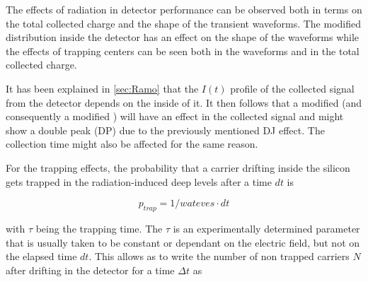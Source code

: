 

The effects of radiation in detector performance can be observed both in terms on the total collected charge and the shape of the transient waveforms. The modified \neff distribution inside the detector has an effect on the shape of the waveforms while the effects of trapping centers can be seen both in the waveforms and in the total collected charge.

It has been explained in \ref{sec:Ramo} that the $I(t)$ profile of the collected signal from the detector depends on the  inside of it. It then follows that a modified \neff (and consequently a modified ) will have an effect in the collected signal and might show a double peak (DP) due to the previously mentioned DJ effect. The collection time might also be affected for the same reason.

For the trapping effects, the probability that a carrier drifting inside the silicon gets trapped in the radiation-induced deep levels after a time $dt$ is

\[p_{trap} = 1/wateves \cdot dt\] %

with $\tau$ being the trapping time. The $\tau$ is an experimentally determined parameter that is usually taken to be constant or dependant on the electric field, but not on the elapsed time $dt$. This allows as to write the number of non trapped carriers $N$ after drifting in the detector for a time $\Delta t$ as

